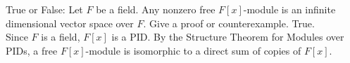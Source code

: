 \documentclass[avery5371,grid]{flashcards}
\begin{document}
\begin{flashcard}[Modules]{True or False: Let $F$ be a field. Any nonzero free $F[x]$-module is an infinite dimensional vector space over $F$. Give a proof or counterexample.}
 True. \\
 
 Since $F$ is a field, $F[x]$ is a PID. By the Structure Theorem for Modules over PIDs, a free $F[x]$-module is isomorphic to a direct sum of copies of $F[x]$.
\end{flashcard}
% 
% 
% 
% 
% 
% 
% 
% 
\end{document}
